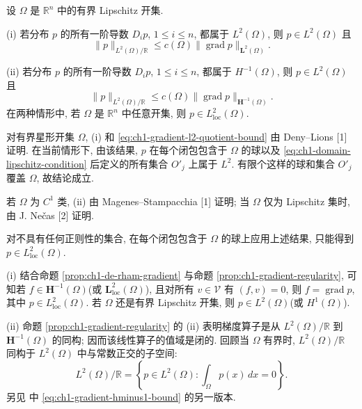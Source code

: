 \begin{Proposition}
\label{prop:ch1-gradient-regularity}
设 $\Omega$ 是 $\mathbb R^n$ 中的有界 Lipschitz 开集.

(i) 若分布 $p$ 的所有一阶导数 $D_i p$, $1\leq i\leq n$, 都属于 $L^2(\Omega)$, 则 $p\in L^2(\Omega)$ 且
\begin{equation}
\lVert p\rVert_{L^2(\Omega)/\mathbb R}
\leq c(\Omega)\lVert\operatorname{grad}p\rVert_{\mathbf L^2(\Omega)}.
\label{eq:ch1-gradient-l2-quotient-bound}
\end{equation}

(ii) 若分布 $p$ 的所有一阶导数 $D_i p$, $1\leq i\leq n$, 都属于 $H^{-1}(\Omega)$, 则 $p\in L^2(\Omega)$ 且
\begin{equation}
\lVert p\rVert_{L^2(\Omega)/\mathbb R}
\leq c(\Omega)\lVert\operatorname{grad}p\rVert_{\mathbf H^{-1}(\Omega)}.
\label{eq:ch1-gradient-hminus1-bound}
\end{equation}
在两种情形中, 若 $\Omega$ 是 $\mathbb R^n$ 中任意开集, 则 $p\in L^2_{\mathrm{loc}}(\Omega)$.
\end{Proposition}

\begin{Proof}
对有界星形开集 $\Omega$, (i) 和 \eqref{eq:ch1-gradient-l2-quotient-bound} 由 Deny--Lions [1] 证明. 在当前情形下, 由该结果, $p$ 在每个闭包包含于 $\Omega$ 的球以及 \eqref{eq:ch1-domain-lipschitz-condition} 后定义的所有集合 $O'_j$ 上属于 $L^2$. 有限个这样的球和集合 $O'_j$ 覆盖 $\Omega$, 故结论成立.

若 $\Omega$ 为 $C^1$ 类, (ii) 由 Magenes--Stampacchia [1] 证明; 当 $\Omega$ 仅为 Lipschitz 集时, 由 J. Nečas [2] 证明.

对不具有任何正则性的集合, 在每个闭包包含于 $\Omega$ 的球上应用上述结果, 只能得到 $p\in L^2_{\mathrm{loc}}(\Omega)$.
\end{Proof}

\begin{Remark}
\label{rem:ch1-gradient-operator-range}
(i) 结合命题 \ref{prop:ch1-de-rham-gradient} 与命题 \ref{prop:ch1-gradient-regularity}, 可知若 $f\in\mathbf H^{-1}(\Omega)$(或 $\mathbf L^2_{\mathrm{loc}}(\Omega)$), 且对所有 $v\in\mathcal V$ 有 $(f,v)=0$, 则 $f=\operatorname{grad}p$, 其中 $p\in L^2_{\mathrm{loc}}(\Omega)$. 若 $\Omega$ 还是有界 Lipschitz 开集, 则 $p\in L^2(\Omega)$(或 $H^1(\Omega)$).

(ii) 命题 \ref{prop:ch1-gradient-regularity} 的 (ii) 表明梯度算子是从 $L^2(\Omega)/\mathbb R$ 到 $\mathbf H^{-1}(\Omega)$ 的同构; 因而该线性算子的值域是闭的. 回顾当 $\Omega$ 有界时, $L^2(\Omega)/\mathbb R$ 同构于 $L^2(\Omega)$ 中与常数正交的子空间:
\[
L^2(\Omega)/\mathbb R
=\left\{p\in L^2(\Omega):\int_\Omega p(x)\,dx=0\right\}.
\]
另见  中 \eqref{eq:ch1-gradient-hminus1-bound} 的另一版本.
\end{Remark}

